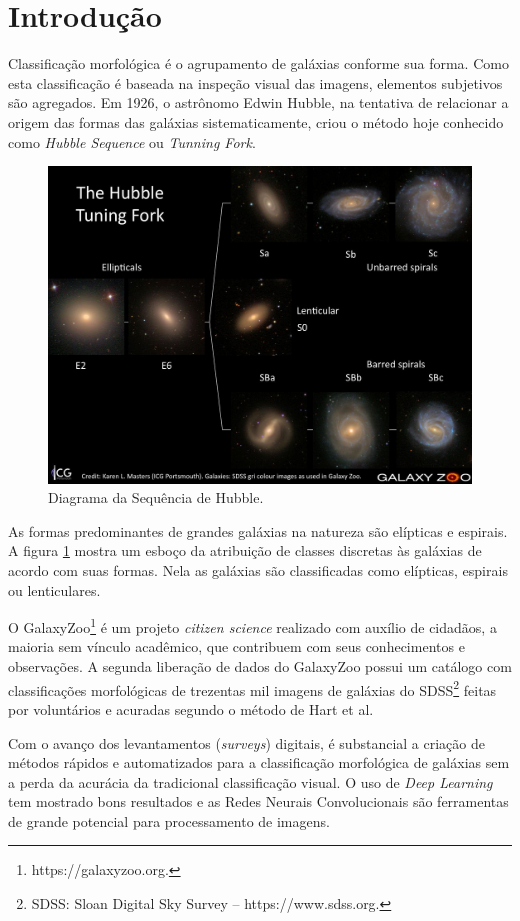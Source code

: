 \section{Introdução}

Classificação morfológica é o agrupamento de galáxias conforme sua forma. Como esta classificação é baseada na inspeção visual das imagens, elementos subjetivos são agregados. Em 1926, o astrônomo Edwin Hubble, na tentativa de relacionar a origem das formas das galáxias sistematicamente, criou o método hoje conhecido como \emph{Hubble Sequence} ou \emph{Tunning Fork}. \cite{hubble1926, fortson2012}

\begin{figure}[h!]
  \centering
  \includegraphics[width=.8\textwidth]{figures/tuningfork1.jpg}
  \caption{Diagrama da Sequência de Hubble.}
  \label{fig:tuningfork}
\end{figure}

As formas predominantes de grandes galáxias na natureza são elípticas e espirais. A figura \ref{fig:tuningfork} mostra um esboço da atribuição de classes discretas às galáxias de acordo com suas formas. Nela as galáxias são classificadas como elípticas, espirais ou lenticulares. \cite{fortson2012}

O GalaxyZoo\footnote{https://galaxyzoo.org.} é um projeto \emph{citizen science} realizado com auxílio de cidadãos, a maioria sem vínculo acadêmico, que contribuem com seus conhecimentos e observações. A segunda liberação de dados do GalaxyZoo possui um catálogo com classificações morfológicas de trezentas mil imagens de galáxias do SDSS\footnote{SDSS: Sloan Digital Sky Survey -- https://www.sdss.org.} feitas por voluntários e acuradas segundo o método de Hart et al. \cite{hart2016}

Com o avanço dos levantamentos (\emph{surveys}) digitais, é substancial a criação de métodos rápidos e automatizados para a classificação morfológica de galáxias sem a perda da acurácia da tradicional classificação visual. \cite{yamauchi2005} O uso de \emph{Deep Learning} tem mostrado bons resultados e as Redes Neurais Convolucionais são ferramentas de grande potencial para processamento de imagens. \cite{barchi2020, dai2018}

